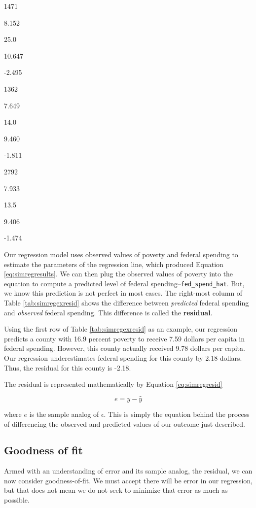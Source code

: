 \documentclass[
]{book}
\begin{document}
1471

8.152

25.0

10.647

-2.495

1362

7.649

14.0

9.460

-1.811

2792

7.933

13.5

9.406

-1.474

Our regression model uses observed values of poverty and federal spending to estimate the parameters of the regression line, which produced Equation \eqref{eq:simregresults}. We can then plug the observed values of poverty into the equation to compute a predicted level of federal spending--\texttt{fed\_spend\_hat}. But, we know this prediction is not perfect in most cases. The right-most column of Table \ref{tab:simregexresid} shows the difference between \emph{predicted} federal spending and \emph{observed} federal spending. This difference is called the \textbf{residual}.

Using the first row of Table \ref{tab:simregexresid} as an example, our regression predicts a county with 16.9 percent poverty to receive 7.59 dollars per capita in federal spending. However, this county actually received 9.78 dollars per capita. Our regression underestimates federal spending for this county by 2.18 dollars. Thus, the residual for this county is -2.18.

The residual is represented mathematically by Equation \eqref{eq:simregresid}

\begin{equation}
e = y - \hat{y}
\label{eq:simregresid}
\end{equation}

where \(e\) is the sample analog of \(\epsilon\). This is simply the equation behind the process of differencing the observed and predicted values of our outcome just described.

\hypertarget{goodness-of-fit}{%
\subsection{Goodness of fit}\label{goodness-of-fit}}

Armed with an understanding of error and its sample analog, the residual, we can now consider goodness-of-fit. We must accept there will be error in our regression, but that does not mean we do not seek to minimize that error as much as possible.
\end{document}
